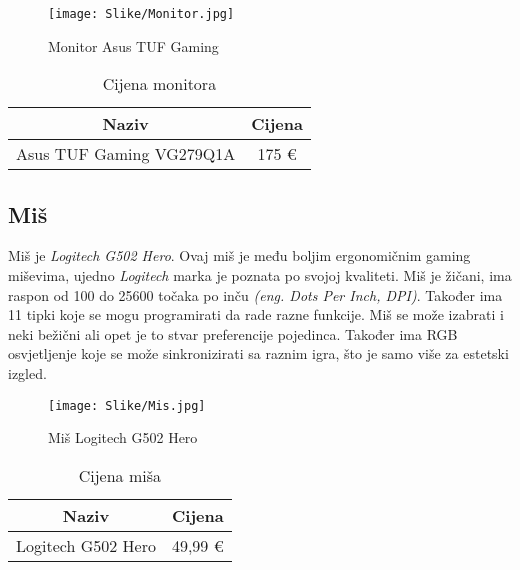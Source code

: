 \documentclass{article}
\begin{document}
    \begin{figure}[H]
        \centering
        \texttt{[image: Slike/Monitor.jpg]}
        \caption{Monitor Asus TUF Gaming}
        \label{fig:Monitor}
    \end{figure}

    \begin{table}[H]
        \centering
        \begin{tabular}{|c|c|}
            \hline
            Naziv & Cijena \\
            \hline
            Asus TUF Gaming VG279Q1A & 175 € \\
            \hline
        \end{tabular}
        \caption{Cijena monitora}
        \label{tab:Monitor}
    \end{table}

    \clearpage
    \subsection{Miš}
    Miš je \textit{Logitech G502 Hero}. Ovaj miš je među boljim ergonomičnim gaming miševima, ujedno \textit{Logitech} marka je poznata po svojoj kvaliteti. Miš je žičani, ima raspon od 100 do 25600 točaka po inču \emph{(eng. Dots Per Inch, DPI)}. Također ima 11 tipki koje se mogu programirati da rade razne funkcije. Miš se može izabrati i neki bežični ali opet je to stvar preferencije pojedinca. Također ima RGB osvjetljenje koje se može sinkronizirati sa raznim igra, što je samo više za estetski izgled.

    \begin{figure}[H]
        \centering
        \texttt{[image: Slike/Mis.jpg]}
        \caption{Miš Logitech G502 Hero}
        \label{fig:Mis}
    \end{figure}

    \begin{table}[H]
        \centering
        \begin{tabular}{|c|c|}
            \hline
            Naziv & Cijena \\
            \hline
            Logitech G502 Hero & 49,99 € \\
            \hline
        \end{tabular}
        \caption{Cijena miša}
        \label{tab:Mis}
    \end{table}

    \clearpage
\end{document}
